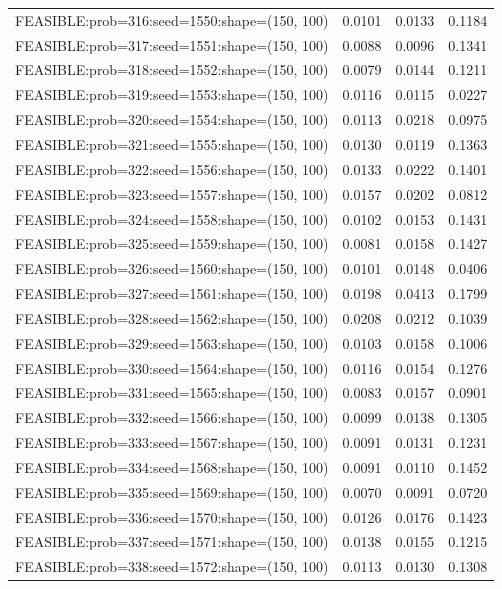 \begin{longtable}{lccc}
FEASIBLE:prob=316:seed=1550:shape=(150, 100) & 0.0101 & 0.0133 & 0.1184 \\
FEASIBLE:prob=317:seed=1551:shape=(150, 100) & 0.0088 & 0.0096 & 0.1341 \\
FEASIBLE:prob=318:seed=1552:shape=(150, 100) & 0.0079 & 0.0144 & 0.1211 \\
FEASIBLE:prob=319:seed=1553:shape=(150, 100) & 0.0116 & 0.0115 & 0.0227 \\
FEASIBLE:prob=320:seed=1554:shape=(150, 100) & 0.0113 & 0.0218 & 0.0975 \\
FEASIBLE:prob=321:seed=1555:shape=(150, 100) & 0.0130 & 0.0119 & 0.1363 \\
FEASIBLE:prob=322:seed=1556:shape=(150, 100) & 0.0133 & 0.0222 & 0.1401 \\
FEASIBLE:prob=323:seed=1557:shape=(150, 100) & 0.0157 & 0.0202 & 0.0812 \\
FEASIBLE:prob=324:seed=1558:shape=(150, 100) & 0.0102 & 0.0153 & 0.1431 \\
FEASIBLE:prob=325:seed=1559:shape=(150, 100) & 0.0081 & 0.0158 & 0.1427 \\
FEASIBLE:prob=326:seed=1560:shape=(150, 100) & 0.0101 & 0.0148 & 0.0406 \\
FEASIBLE:prob=327:seed=1561:shape=(150, 100) & 0.0198 & 0.0413 & 0.1799 \\
FEASIBLE:prob=328:seed=1562:shape=(150, 100) & 0.0208 & 0.0212 & 0.1039 \\
FEASIBLE:prob=329:seed=1563:shape=(150, 100) & 0.0103 & 0.0158 & 0.1006 \\
FEASIBLE:prob=330:seed=1564:shape=(150, 100) & 0.0116 & 0.0154 & 0.1276 \\
FEASIBLE:prob=331:seed=1565:shape=(150, 100) & 0.0083 & 0.0157 & 0.0901 \\
FEASIBLE:prob=332:seed=1566:shape=(150, 100) & 0.0099 & 0.0138 & 0.1305 \\
FEASIBLE:prob=333:seed=1567:shape=(150, 100) & 0.0091 & 0.0131 & 0.1231 \\
FEASIBLE:prob=334:seed=1568:shape=(150, 100) & 0.0091 & 0.0110 & 0.1452 \\
FEASIBLE:prob=335:seed=1569:shape=(150, 100) & 0.0070 & 0.0091 & 0.0720 \\
FEASIBLE:prob=336:seed=1570:shape=(150, 100) & 0.0126 & 0.0176 & 0.1423 \\
FEASIBLE:prob=337:seed=1571:shape=(150, 100) & 0.0138 & 0.0155 & 0.1215 \\
FEASIBLE:prob=338:seed=1572:shape=(150, 100) & 0.0113 & 0.0130 & 0.1308 \\

\end{longtable}
